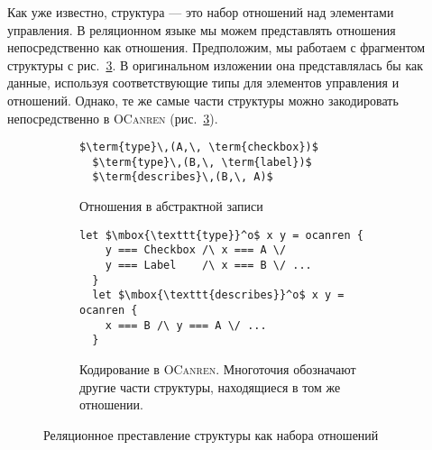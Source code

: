 Как уже известно, структура --- это набор отношений над элементами управления. В реляционном языке мы можем представлять отношения непосредственно как отношения.
Предположим, мы работаем с фрагментом структуры с рис.~\ref{rel_rel}. В оригинальном изложении она представлялась бы как данные,
используя соответствующие типы для элементов управления и отношений. Однако, те же самые части структуры можно закодировать непосредственно в
\textsc{OCanren} (рис.~\ref{rel_rel}).


\begin{figure}[t]
  \begin{subfigure}[t]{0.5\textwidth}
    \begin{lstlisting}[basicstyle=\small,language=ocanren]
  $\term{type}\,(A,\, \term{checkbox})$
  $\term{type}\,(B,\, \term{label})$
  $\term{describes}\,(B,\, A)$
    \end{lstlisting}
    \caption{Отношения в абстрактной записи}
    \label{rel_abs}
  \end{subfigure}
  \begin{subfigure}[t]{0.5\textwidth}
    \begin{lstlisting}[basicstyle=\small,language=ocanren]
  let $\mbox{\texttt{type}}^o$ x y = ocanren {
    y === Checkbox /\ x === A \/
    y === Label    /\ x === B \/ ...
  }
  let $\mbox{\texttt{describes}}^o$ x y = ocanren {
    x === B /\ y === A \/ ...
  }
    \end{lstlisting}
    \caption{Кодирование в \textsc{OCanren}. Многоточия обозначают другие части структуры, находящиеся в том же отношении.}
    \label{rel_con}
  \end{subfigure}
  \caption{Реляционное преставление структуры как набора отношений}
  \label{rel_rel}
\end{figure}

